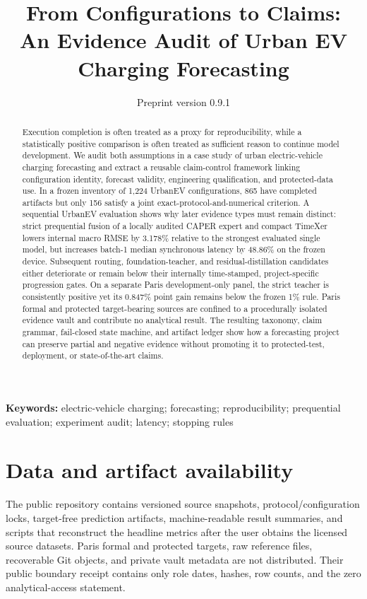 \documentclass[11pt]{article}
\title{From Configurations to Claims:\\An Evidence Audit of Urban EV Charging Forecasting}
\date{Preprint version 0.9.1}
\begin{document}
\maketitle
\provisionalauthorshipnote
\begin{abstract}
Execution completion is often treated as a proxy for reproducibility, while a statistically positive comparison is often treated as sufficient reason to continue model development. We audit both assumptions in a case study of urban electric-vehicle charging forecasting and extract a reusable claim-control framework linking configuration identity, forecast validity, engineering qualification, and protected-data use. In a frozen inventory of 1,224 UrbanEV configurations, 865 have completed artifacts but only 156 satisfy a joint exact-protocol-and-numerical criterion. A sequential UrbanEV evaluation shows why later evidence types must remain distinct: strict prequential fusion of a locally audited CAPER expert and compact TimeXer lowers internal macro RMSE by 3.178\% relative to the strongest evaluated single model, but increases batch-1 median synchronous latency by 48.86\% on the frozen device. Subsequent routing, foundation-teacher, and residual-distillation candidates either deteriorate or remain below their internally time-stamped, project-specific progression gates. On a separate Paris development-only panel, the strict teacher is consistently positive yet its 0.847\% point gain remains below the frozen 1\% rule. Paris formal and protected target-bearing sources are confined to a procedurally isolated evidence vault and contribute no analytical result. The resulting taxonomy, claim grammar, fail-closed state machine, and artifact ledger show how a forecasting project can preserve partial and negative evidence without promoting it to protected-test, deployment, or state-of-the-art claims.
\end{abstract}
\noindent\textbf{Keywords:} electric-vehicle charging; forecasting; reproducibility; prequential evaluation; experiment audit; latency; stopping rules







\section*{Data and artifact availability}
The public repository contains versioned source snapshots, protocol/configuration locks, target-free prediction artifacts, machine-readable result summaries, and scripts that reconstruct the headline metrics after the user obtains the licensed source datasets. Paris formal and protected targets, raw reference files, recoverable Git objects, and private vault metadata are not distributed. Their public boundary receipt contains only role dates, hashes, row counts, and the zero analytical-access statement.
\end{document}
